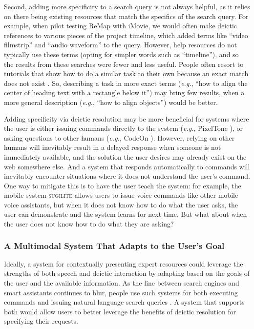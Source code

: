 Second, adding more specificity to a search query is not always helpful, as it relies on there being existing resources that match the specifics of the search query. For example, when pilot testing ReMap with iMovie, we would often make deictic references to various pieces of the project timeline, which added terms like ``video filmstrip'' and ``audio waveform'' to the query. However, help resources do not typically use these terms (opting for simpler words such as ``timeline''), and so the results from these searches were fewer and less useful. People often resort to tutorials that show how to do a similar task to their own because an exact match does not exist \cite{Lafreniere2014a}. So, describing a task in more exact terms (\textit{e.g.}, ``how to align the center of heading text with a rectangle below it'') may bring few results, when a more general description (\textit{e.g.}, ``how to align objects'') would be better.

Adding specificity via deictic resolution may be more beneficial for systems where the user is either issuing commands directly to the system (\textit{e.g.}, PixelTone \cite{Laput2013}), or asking questions to other humans (\textit{e.g.}, CodeOn \cite{Chen2017}). However, relying on other humans will inevitably result in a delayed response when someone is not immediately available, and the solution the user desires may already exist on the web somewhere else. And a system that responds automatically to commands will inevitably encounter situations where it does not understand the user's command. One way to mitigate this is to have the user teach the system: for example, the mobile system \textsc{sugilite} \cite{Li2017} allows users to issue voice commands like other mobile voice assistants, but when it does not know how to do what the user asks, the user can demonstrate and the system learns for next time. But what about when the user does not know how to do what they are asking?

\subsubsection{A Multimodal System That Adapts to the User's Goal}
Ideally, a system for contextually presenting expert resources could leverage the strengths of both speech and deictic interaction by adapting based on the goals of the user and the available information. As the line between search engines and smart assistants continues to blur, people use such systems for both executing commands and issuing natural language search queries \cite{Bota2018, Adar2014, Fourney2016, Norman2007}. A system that supports both would allow users to better leverage the benefits of deictic resolution for specifying their requests. 

